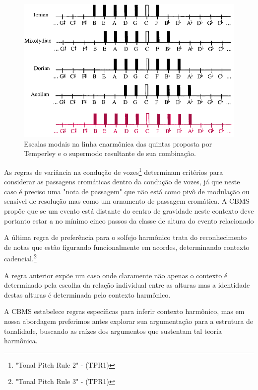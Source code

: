 \documentclass[
	12pt,				%
	openright,			%
	twoside,			%
	a4paper,			%
	english,			%
	french,				%
	spanish,			%
	brazil				%
	]{abntex2}
\begin{document}
\begin{figure}[!h]
	\caption{\label{fig_grafico}Escalas modais na linha enarmônica das quintas proposta por Temperley e o supermodo resultante de sua combinação. }
	\begin{center}
	    \includegraphics[scale=0.6]{CBMS/modosrockgregos_temperley.png}
	\end{center}
\end{figure}






As regras de variância na condução de vozes\footnote{"Tonal Pitch Rule 2" - (TPR1)\cite[ p.129]{temperley2004cognition}} determinam critérios para considerar as passagens cromáticas dentro da condução de vozes, já que neste caso é preciso uma "nota de passagem" que não está como pivô de modulação ou sensível de resolução mas como um ornamento de passagem cromática. A CBMS propõe que se um evento está distante do centro de gravidade neste contexto deve portanto estar a no mínimo cinco passos da classe de altura do evento relacionado\cite[ p.130]{temperley1997algorithm}

A última regra de preferência para o solfejo harmônico trata do reconhecimento de notas que estão figurando funcionalmente em acordes, determinando contexto cadencial.\footnote{"Tonal Pitch Rule 3" - (TPR1)\cite[ p.131]{temperley2004cognition}}

A regra anterior expõe um caso onde claramente não apenas o contexto é determinado pela escolha da relação individual entre as alturas  mas a identidade destas alturas é determinada pelo contexto harmônico. 

A CBMS estabelece regras específicas para inferir contexto harmônico, mas em nossa abordagem preferimos antes explorar sua argumentação para a estrutura de tonalidade, buscando as raízes dos argumentos que sustentam tal teoria harmônica. 
\end{document}
